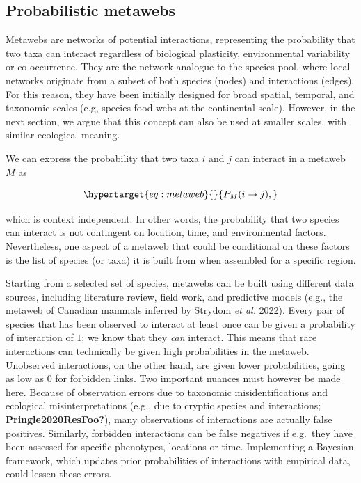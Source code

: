 \documentclass[10pt,oneside]{article}
\begin{document}
\hypertarget{probabilistic-metawebs}{%
\subsection{Probabilistic metawebs}\label{probabilistic-metawebs}}

Metawebs are networks of potential interactions, representing the
probability that two taxa can interact regardless of biological
plasticity, environmental variability or co-occurrence. They are the
network analogue to the species pool, where local networks originate
from a subset of both species (nodes) and interactions (edges). For this
reason, they have been initially designed for broad spatial, temporal,
and taxonomic scales (e.g, species food webs at the continental scale).
However, in the next section, we argue that this concept can also be
used at smaller scales, with similar ecological meaning.

We can express the probability that two taxa \(i\) and \(j\) can
interact in a metaweb \(M\) as

\begin{equation}\protect\hypertarget{eq:metaweb}{}{P_{M}(i \rightarrow j),}\label{eq:metaweb}\end{equation}

which is context independent. In other words, the probability that two
species can interact is not contingent on location, time, and
environmental factors. Nevertheless, one aspect of a metaweb that could
be conditional on these factors is the list of species (or taxa) it is
built from when assembled for a specific region.

Starting from a selected set of species, metawebs can be built using
different data sources, including literature review, field work, and
predictive models (e.g., the metaweb of Canadian mammals inferred by
Strydom \emph{et al.} 2022). Every pair of species that has been
observed to interact at least once can be given a probability of
interaction of \(1\); we know that they \emph{can} interact. This means
that rare interactions can technically be given high probabilities in
the metaweb. Unobserved interactions, on the other hand, are given lower
probabilities, going as low as \(0\) for forbidden links. Two important
nuances must however be made here. Because of observation errors due to
taxonomic misidentifications and ecological misinterpretations (e.g.,
due to cryptic species and interactions; \textbf{Pringle2020ResFoo?}),
many observations of interactions are actually false positives.
Similarly, forbidden interactions can be false negatives if e.g.~they
have been assessed for specific phenotypes, locations or time.
Implementing a Bayesian framework, which updates prior probabilities of
interactions with empirical data, could lessen these errors.
\end{document}
